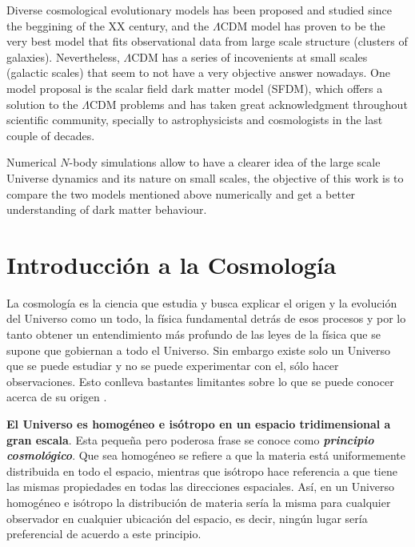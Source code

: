 \documentclass[a4paper,openright,10pt, oneside, final]{book}
\begin{document}
Diverse cosmological evolutionary models has been proposed and studied since the beggining of the XX century, and the $\Lambda$CDM model has proven to be the very best model that fits observational data from large scale structure (clusters of galaxies). Nevertheless, $\Lambda$CDM has a series of incovenients at small scales (galactic scales) that seem to not have a very objective answer nowadays. One model proposal is the scalar field dark matter model (SFDM), which offers a solution to the $\Lambda$CDM problems and has taken great acknowledgment throughout scientific community, specially to astrophysicists and cosmologists in the last couple of decades.

Numerical $N$-body simulations allow to have a clearer idea of the large scale Universe dynamics and its nature on small scales, the objective of this work is to compare the two models mentioned above numerically and get a better understanding of dark matter behaviour.
\thispagestyle{empty}

\tableofcontents %

\cleardoublepage
\listoffigures %





\chapter{Introducción a la Cosmología}
La cosmología es la ciencia que estudia y busca explicar el origen y la evolución del Universo como un todo, la física fundamental detrás de esos procesos y por lo tanto obtener un entendimiento más profundo de las leyes de la física que se supone que gobiernan a todo el Universo. Sin embargo existe solo un Universo que se puede estudiar y no se puede  experimentar con el, sólo hacer observaciones. Esto conlleva bastantes limitantes sobre lo que se puede conocer acerca de su origen \cite{1.01}. 

\textbf{El Universo es homogéneo e isótropo en un espacio tridimensional a gran escala}. Esta pequeña pero poderosa frase se conoce como \textbf{\textit{principio cosmológico}}. Que sea homogéneo se refiere a que la materia está uniformemente distribuida en todo el espacio, mientras que isótropo hace referencia a que tiene las mismas propiedades en todas las direcciones espaciales. Así, en un Universo homogéneo e isótropo la distribución de materia sería la misma para cualquier observador en cualquier ubicación del espacio, es decir, ningún lugar sería preferencial de acuerdo a este principio.
\end{document}

